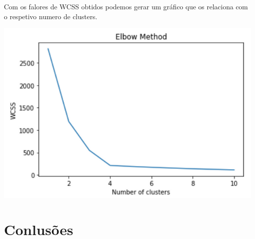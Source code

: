 \documentclass[12pt, a4paper, oneside]{scrreport}
\begin{document}
Com os falores de WCSS obtidos podemos gerar um gráfico que os relaciona com o respetivo numero de clusters.

\includegraphics[scale=0.5]{ex2.png}

\newpage
\chapter{Conlusões}

\renewcommand\refname{Referências}
\end{document}
